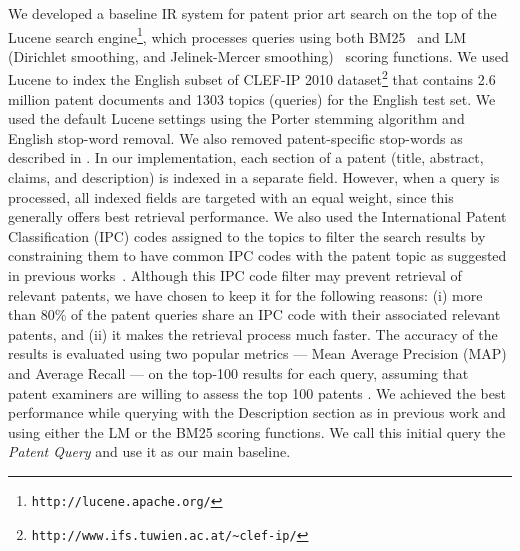 We developed a baseline IR system for patent prior art search on the top of
the Lucene search engine\footnote{\texttt{http://lucene.apache.org/}}, which processes queries using both BM25~\cite{Robertson1993} and LM (Dirichlet
smoothing, and Jelinek-Mercer smoothing)~\cite{zhai2004study} scoring functions. %
We used Lucene to index the English subset of CLEF-IP 2010 dataset\footnote{\texttt{http://www.ifs.tuwien.ac.at/\textasciitilde{}clef-ip/}} 
that contains 2.6 million patent documents and 1303 topics (queries) for the English test set.
We used the default Lucene settings using the Porter stemming algorithm \cite{Porter1980} and English stop-word removal. 
We also removed patent-specific stop-words as described in \cite{magdy2012toward}.
In
our implementation, each section of a patent (title, abstract, claims,
and description) is indexed in a separate field. However, when a query 
is processed, all indexed fields are targeted with an equal weight, since this generally
offers best retrieval performance. We also used the International
Patent Classification (IPC) codes assigned to the topics to filter
the search results by constraining them to have common IPC codes with
the patent topic as suggested in previous works~\cite{lopez2010patatras}.
Although this IPC code filter may prevent retrieval of relevant patents, we
have chosen to keep it for the following reasons: (i) more than 80\%
of the patent queries share an IPC code with their associated relevant
patents, and (ii) it makes the retrieval process much faster. The accuracy of the results is evaluated using two popular metrics --- Mean Average Precision (MAP) and Average Recall --- on the top-100 results for each query, assuming that patent examiners are willing to assess the top 100 patents \cite{joho2010survey}. 
We achieved the best performance while querying with the Description
section as in previous work \cite{xue2009transforming} and using
either the LM or the BM25 scoring functions. We call this initial
query the \textit{Patent Query} and use it as our main baseline.

